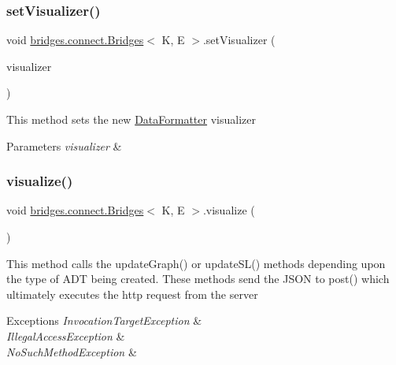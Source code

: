 \hypertarget{classbridges_1_1connect_1_1_bridges_ad627f604914734646e92fac9e7b385d8}{}\label{classbridges_1_1connect_1_1_bridges_ad627f604914734646e92fac9e7b385d8} 
\subsubsection{\texorpdfstring{set\+Visualizer()}{setVisualizer()}}
{\footnotesize\ttfamily void \hyperlink{classbridges_1_1connect_1_1_bridges}{bridges.\+connect.\+Bridges}$<$ K, E $>$.set\+Visualizer (\begin{DoxyParamCaption}\item[{\hyperlink{classbridges_1_1base_1_1_a_d_t_visualizer}{A\+D\+T\+Visualizer}$<$ K, E $>$}]{visualizer }\end{DoxyParamCaption})}

This method sets the new \hyperlink{classbridges_1_1connect_1_1_data_formatter}{Data\+Formatter} visualizer 
\begin{DoxyParams}{Parameters}
{\em visualizer} & \\
\hline
\end{DoxyParams}
\hypertarget{classbridges_1_1connect_1_1_bridges_a6881ed6e3f3a1db1d3cda249eb8543a1}{}\label{classbridges_1_1connect_1_1_bridges_a6881ed6e3f3a1db1d3cda249eb8543a1} 
\subsubsection{\texorpdfstring{visualize()}{visualize()}}
{\footnotesize\ttfamily void \hyperlink{classbridges_1_1connect_1_1_bridges}{bridges.\+connect.\+Bridges}$<$ K, E $>$.visualize (\begin{DoxyParamCaption}{ }\end{DoxyParamCaption})}

This method calls the update\+Graph() or update\+S\+L() methods depending upon the type of A\+DT being created. These methods send the J\+S\+ON to post() which ultimately executes the http request from the server 
\begin{DoxyExceptions}{Exceptions}
{\em Invocation\+Target\+Exception} & \\
\hline
{\em Illegal\+Access\+Exception} & \\
\hline
{\em No\+Such\+Method\+Exception} & \\
\hline
\end{DoxyExceptions}
\hypertarget{classbridges_1_1connect_1_1_bridges_ac4e90699b288fcfbaf19e59bc4dbafb3}{}\label{classbridges_1_1connect_1_1_bridges_ac4e90699b288fcfbaf19e59bc4dbafb3} 
